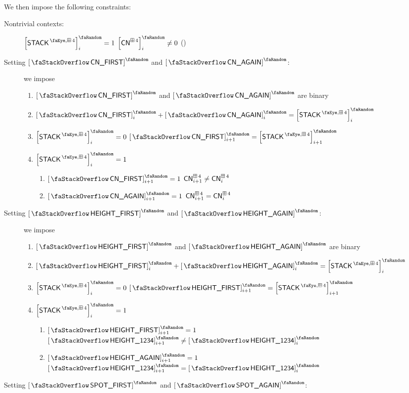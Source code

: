 We then impose the following constraints:
\begin{description}
	\item[Nontrivial contexts:] \If $\order{\peekStackFour}_{i} = 1$ \Then $\order{\cn^{\cc4}}_{i} \neq 0$ \quad (\trash)
	\item[Setting $\stackContextFirst$ and $\stackContextAgain$:]
		we impose
		\begin{enumerate}
			\item $\stackContextFirst$ and $\stackContextAgain$ are binary
			\item $\stackContextFirst_{i} + \stackContextAgain_{i} = \order{\peekStackFour}_{i}$
			\item \If $\order{\peekStackFour}_{i} = 0$ \Then $\stackContextFirst_{i + 1} = \order{\peekStackFour}_{i + 1}$
			\item \If $\order{\peekStackFour}_{i} = 1$ \Then
				\begin{enumerate}
					\item \If $\stackContextFirst_{i + 1} = 1$ \Then $\textsf{CN}^{\operatorname{\boxplus}4}_{i + 1} \neq \textsf{CN}^{\operatorname{\boxplus}4}_{i}$
					\item \If $\stackContextAgain_{i + 1} = 1$ \Then $\textsf{CN}^{\operatorname{\boxplus}4}_{i + 1} =    \textsf{CN}^{\operatorname{\boxplus}4}_{i}$
				\end{enumerate}
		\end{enumerate}
	\item[Setting $\stackHeightFirst$ and $\stackHeightAgain$:]
		we impose
		\begin{enumerate}
			\item $\stackHeightFirst$ and $\stackHeightAgain$ are binary
			\item $\stackHeightFirst_{i} + \stackHeightAgain_{i} = \order{\peekStackFour}_{i}$
			\item \If $\order{\peekStackFour}_{i} = 0$ \Then $\stackHeightFirst_{i + 1} = \order{\peekStackFour}_{i + 1}$
			\item \If $\order{\peekStackFour}_{i} = 1$ \Then
				\begin{enumerate}
					\item \If $\stackHeightFirst_{i + 1} = 1$ \Then $\order{\stackItemHeight{\col{1234}}}_{i + 1} \neq \order{\stackItemHeight{\col{1234}}}_{i}$
					\item \If $\stackHeightAgain_{i + 1} = 1$ \Then $\order{\stackItemHeight{\col{1234}}}_{i + 1} =    \order{\stackItemHeight{\col{1234}}}_{i}$
				\end{enumerate}
		\end{enumerate}
	\item[Setting $\stackSpotFirst$ and $\stackSpotAgain$:]

\end{description}
